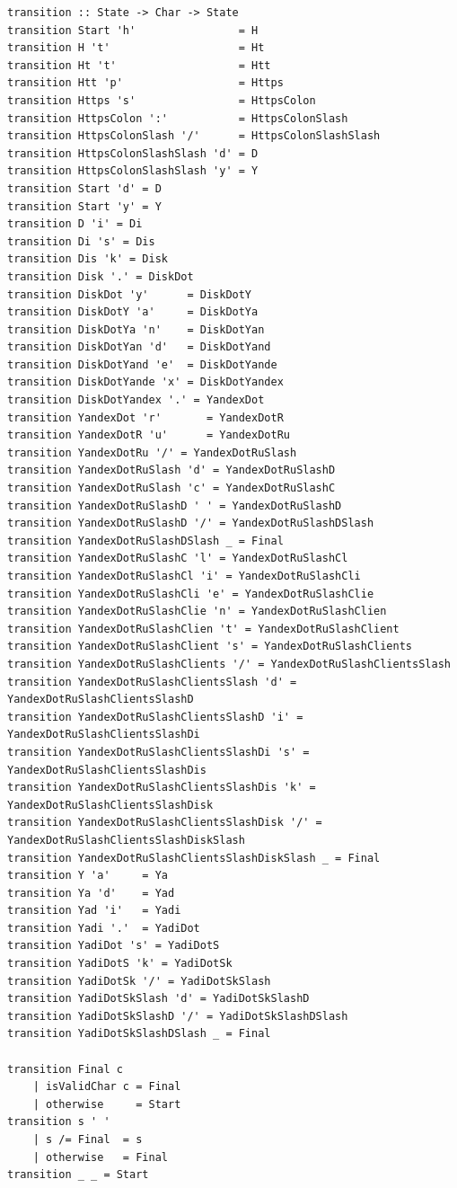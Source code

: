 \documentclass[areasetadvanced]{scrartcl}
\begin{document}
\begin{lstlisting}[caption={Lib.hs}, label={lst:example}]
transition :: State -> Char -> State
transition Start 'h'                = H
transition H 't'                    = Ht
transition Ht 't'                   = Htt
transition Htt 'p'                  = Https
transition Https 's'                = HttpsColon
transition HttpsColon ':'           = HttpsColonSlash
transition HttpsColonSlash '/'      = HttpsColonSlashSlash
transition HttpsColonSlashSlash 'd' = D
transition HttpsColonSlashSlash 'y' = Y
transition Start 'd' = D
transition Start 'y' = Y
transition D 'i' = Di
transition Di 's' = Dis
transition Dis 'k' = Disk
transition Disk '.' = DiskDot
transition DiskDot 'y'      = DiskDotY
transition DiskDotY 'a'     = DiskDotYa
transition DiskDotYa 'n'    = DiskDotYan
transition DiskDotYan 'd'   = DiskDotYand
transition DiskDotYand 'e'  = DiskDotYande
transition DiskDotYande 'x' = DiskDotYandex
transition DiskDotYandex '.' = YandexDot
transition YandexDot 'r'       = YandexDotR
transition YandexDotR 'u'      = YandexDotRu
transition YandexDotRu '/' = YandexDotRuSlash
transition YandexDotRuSlash 'd' = YandexDotRuSlashD
transition YandexDotRuSlash 'c' = YandexDotRuSlashC    
transition YandexDotRuSlashD ' ' = YandexDotRuSlashD
transition YandexDotRuSlashD '/' = YandexDotRuSlashDSlash
transition YandexDotRuSlashDSlash _ = Final
transition YandexDotRuSlashC 'l' = YandexDotRuSlashCl
transition YandexDotRuSlashCl 'i' = YandexDotRuSlashCli
transition YandexDotRuSlashCli 'e' = YandexDotRuSlashClie
transition YandexDotRuSlashClie 'n' = YandexDotRuSlashClien
transition YandexDotRuSlashClien 't' = YandexDotRuSlashClient
transition YandexDotRuSlashClient 's' = YandexDotRuSlashClients
transition YandexDotRuSlashClients '/' = YandexDotRuSlashClientsSlash
transition YandexDotRuSlashClientsSlash 'd' = YandexDotRuSlashClientsSlashD
transition YandexDotRuSlashClientsSlashD 'i' = YandexDotRuSlashClientsSlashDi
transition YandexDotRuSlashClientsSlashDi 's' = YandexDotRuSlashClientsSlashDis
transition YandexDotRuSlashClientsSlashDis 'k' = YandexDotRuSlashClientsSlashDisk
transition YandexDotRuSlashClientsSlashDisk '/' = YandexDotRuSlashClientsSlashDiskSlash
transition YandexDotRuSlashClientsSlashDiskSlash _ = Final
transition Y 'a'     = Ya
transition Ya 'd'    = Yad
transition Yad 'i'   = Yadi
transition Yadi '.'  = YadiDot
transition YadiDot 's' = YadiDotS
transition YadiDotS 'k' = YadiDotSk
transition YadiDotSk '/' = YadiDotSkSlash
transition YadiDotSkSlash 'd' = YadiDotSkSlashD
transition YadiDotSkSlashD '/' = YadiDotSkSlashDSlash
transition YadiDotSkSlashDSlash _ = Final

transition Final c
    | isValidChar c = Final
    | otherwise     = Start
transition s ' '
    | s /= Final  = s
    | otherwise   = Final
transition _ _ = Start


\end{lstlisting}
\end{document}
